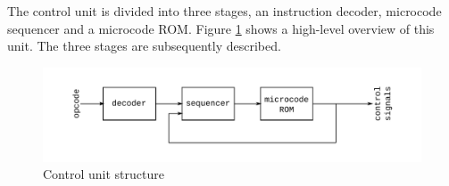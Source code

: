 The control unit is divided into three stages, an instruction decoder,
microcode sequencer and a microcode ROM. Figure \ref{fig:control} shows a high-level
overview of this unit. The three stages are subsequently described.
\begin{figure}[h]
	\centering
	\includegraphics[width=\textwidth]{../fig/control.pdf}
	\caption{Control unit structure}
	\label{fig:control}
\end{figure}
